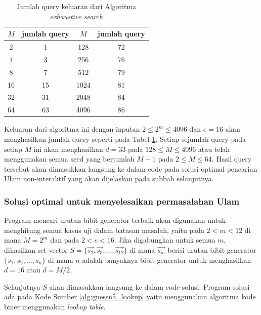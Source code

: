 \begin{table}[h!]
\caption{Jumlah query keluaran dari Algoritma \textit{exhaustive search}}
\label{tab:query_count}
\begin{center}
\begin{tabular}{|c|c|c|c|}
\hline
$M$ & jumlah query & $M$ & jumlah query \\
\hline
2 & 1 & 128 & 72 \\
\hline
4 & 3 & 256 & 76 \\
\hline
8 & 7 & 512 & 79 \\
\hline
16 & 15 & 1024 & 81 \\
\hline
32 & 31 & 2048 & 84 \\
\hline
64 & 63 & 4096 & 86 \\
\hline
\end{tabular}
\end{center}
\end{table}

Keluaran dari algoritma ini dengan inputan $2 \leq 2^m \leq 4096$ dan $e=16$ akan menghasilkan jumlah query seperti pada Tabel \ref{tab:query_count}. Setiap sejumlah query pada setiap $M$ ini akan menghasilkan $d = 33$ pada $128 \leq M \leq 4096$ atau telah menggunakan semua seed yang berjumlah $M-1$ pada $2 \leq M \leq 64$. Hasil query tersebut akan dimasukkan langsung ke dalam code pada solusi optimal pencarian Ulam non-interaktif yang akan dijelaskan pada subbab selanjutnya.

\subsubsection{Solusi optimal untuk menyelesaikan permasalahan Ulam}

Program mencari urutan bibit generator terbaik akan digunakan untuk menghitung semua kasus uji dalam batasan masalah, yaitu pada $2 < m < 12$ di mana $M = 2^m$ dan pada $2 < e < 16$. Jika digabungkan untuk semua $m$, dihasilkan set vector $S = \{\vec{s_2}, \vec{s_3}, \ldots, \vec{s_12}\}$ di mana $\vec{s_m}$ berisi urutan bibit generator $\{s_1, s_2, \ldots, s_n\}$ di mana $n$ adalah banyaknya bibit generator untuk menghasilkan $d=16$ atau $d=M/2$.

Selanjutnya $S$ akan dimasukkan langsung ke dalam code solusi. Program solusi ada pada Kode Sumber \ref{alg:guessn5_lookup} yaitu menggunakan algoritma kode biner menggunakan \textit{lookup table}.

